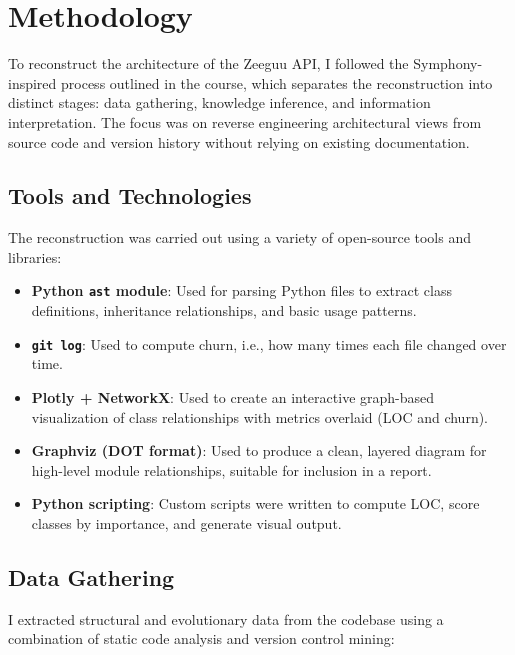 \section{Methodology}

To reconstruct the architecture of the Zeeguu API, I followed the Symphony-inspired process outlined in the course, which separates the reconstruction into distinct stages: data gathering, knowledge inference, and information interpretation. The focus was on reverse engineering architectural views from source code and version history without relying on existing documentation.

\subsection{Tools and Technologies}

The reconstruction was carried out using a variety of open-source tools and libraries:

\begin{itemize}
  \item \textbf{Python \texttt{ast} module}: Used for parsing Python files to extract class definitions, inheritance relationships, and basic usage patterns.
  \item \textbf{\texttt{git log}}: Used to compute churn, i.e., how many times each file changed over time.
  \item \textbf{Plotly + NetworkX}: Used to create an interactive graph-based visualization of class relationships with metrics overlaid (LOC and churn).
  \item \textbf{Graphviz (DOT format)}: Used to produce a clean, layered diagram for high-level module relationships, suitable for inclusion in a report.
  \item \textbf{Python scripting}: Custom scripts were written to compute LOC, score classes by importance, and generate visual output.
\end{itemize}

\subsection{Data Gathering}

I extracted structural and evolutionary data from the codebase using a combination of static code analysis and version control mining:


